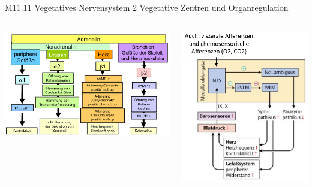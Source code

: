 \documentclass{beamer}
\begin{document}
\begin{frame}{M11.11 Vegetatives Nervensystem 2 Vegetative Zentren und Organregulation}

\begin{columns}[c]

\begin{column}{7cm}

    \begin{center}
        \includegraphics[width=\textwidth]{adrenerge_systeme.png}
    \end{center}

\end{column}

\pause

\begin{column}{4cm}
        \begin{center}
        \includegraphics[width=\textwidth]{kreislauf.png}
    \end{center}


\end{column}
\end{columns}
\end{frame}
\end{document}
